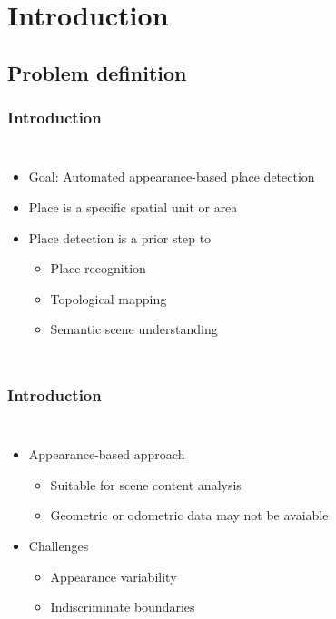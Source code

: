 \section{Introduction}
\subsection{Problem definition}
\frame
{
	\frametitle{Introduction}
	
	\begin{columns}[t,onlytextwidth]
		\hspace*{-1cm}
		
		\vspace{-0.5cm}
		\begin{itemize}
			\item Goal: Automated appearance-based place detection 
			\item Place is a specific spatial unit or area  
			\item Place detection is a prior step to
			\begin{itemize}
				\item Place recognition
				\item Topological mapping
				\item Semantic scene understanding
			\end{itemize}
		\end{itemize}
	\end{columns}
}
\frame
{
	\frametitle{Introduction}
	
	\begin{columns}[t,onlytextwidth]
		\hspace*{-1cm}
		
		\vspace{-0.5cm}
		\begin{itemize}
			\item Appearance-based approach
			\begin{itemize}
				\item Suitable for scene content analysis 
				\item Geometric or odometric data may not be avaiable
			\end{itemize}
			\item Challenges
			\begin{itemize}
				\item Appearance variability
				\item Indiscriminate boundaries
			\end{itemize}
		\end{itemize}
	\end{columns}
}
